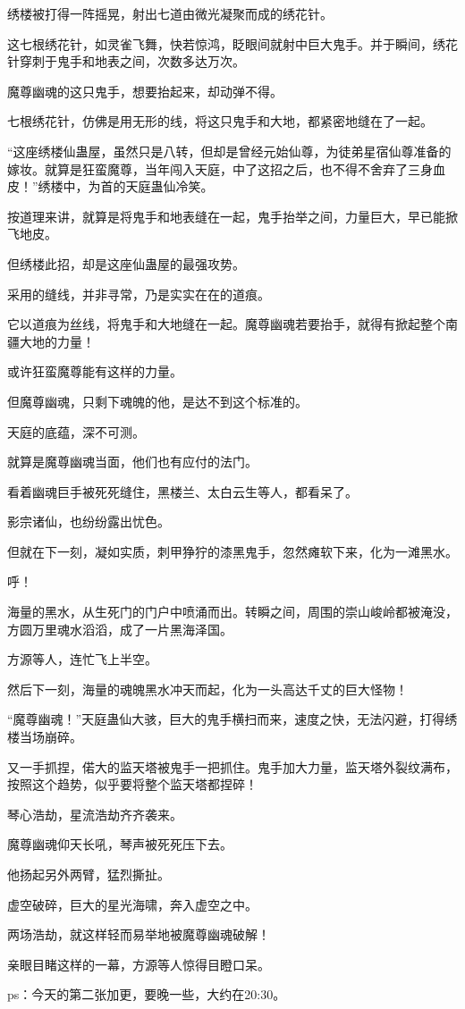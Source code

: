 \begin{this_body}
绣楼被打得一阵摇晃，射出七道由微光凝聚而成的绣花针。

这七根绣花针，如灵雀飞舞，快若惊鸿，眨眼间就射中巨大鬼手。并于瞬间，绣花针穿刺于鬼手和地表之间，次数多达万次。

魔尊幽魂的这只鬼手，想要抬起来，却动弹不得。

七根绣花针，仿佛是用无形的线，将这只鬼手和大地，都紧密地缝在了一起。

“这座绣楼仙蛊屋，虽然只是八转，但却是曾经元始仙尊，为徒弟星宿仙尊准备的嫁妆。就算是狂蛮魔尊，当年闯入天庭，中了这招之后，也不得不舍弃了三身血皮！”绣楼中，为首的天庭蛊仙冷笑。

按道理来讲，就算是将鬼手和地表缝在一起，鬼手抬举之间，力量巨大，早已能掀飞地皮。

但绣楼此招，却是这座仙蛊屋的最强攻势。

采用的缝线，并非寻常，乃是实实在在的道痕。

它以道痕为丝线，将鬼手和大地缝在一起。魔尊幽魂若要抬手，就得有掀起整个南疆大地的力量！

或许狂蛮魔尊能有这样的力量。

但魔尊幽魂，只剩下魂魄的他，是达不到这个标准的。

天庭的底蕴，深不可测。

就算是魔尊幽魂当面，他们也有应付的法门。

看着幽魂巨手被死死缝住，黑楼兰、太白云生等人，都看呆了。

影宗诸仙，也纷纷露出忧色。

但就在下一刻，凝如实质，刺甲狰狞的漆黑鬼手，忽然瘫软下来，化为一滩黑水。

呼！

海量的黑水，从生死门的门户中喷涌而出。转瞬之间，周围的崇山峻岭都被淹没，方圆万里魂水滔滔，成了一片黑海泽国。

方源等人，连忙飞上半空。

然后下一刻，海量的魂魄黑水冲天而起，化为一头高达千丈的巨大怪物！

“魔尊幽魂！”天庭蛊仙大骇，巨大的鬼手横扫而来，速度之快，无法闪避，打得绣楼当场崩碎。

又一手抓捏，偌大的监天塔被鬼手一把抓住。鬼手加大力量，监天塔外裂纹满布，按照这个趋势，似乎要将整个监天塔都捏碎！

琴心浩劫，星流浩劫齐齐袭来。

魔尊幽魂仰天长吼，琴声被死死压下去。

他扬起另外两臂，猛烈撕扯。

虚空破碎，巨大的星光海啸，奔入虚空之中。

两场浩劫，就这样轻而易举地被魔尊幽魂破解！

亲眼目睹这样的一幕，方源等人惊得目瞪口呆。

ps：今天的第二张加更，要晚一些，大约在20:30。

\end{this_body}

